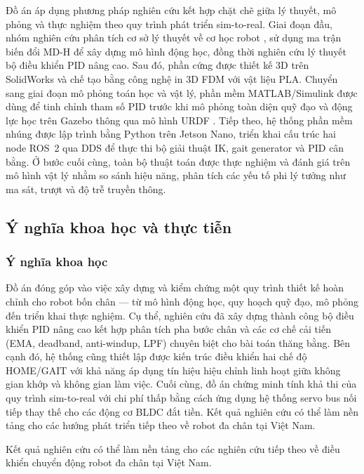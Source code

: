 Đồ án áp dụng phương pháp nghiên cứu kết hợp chặt chẽ giữa lý thuyết, mô phỏng và thực nghiệm theo quy trình phát triển sim-to-real. Giai đoạn đầu, nhóm nghiên cứu phân tích cơ sở lý thuyết về cơ học robot \cite{siciliano2009, craig2005, spong2020}, sử dụng ma trận biến đổi MD-H để xây dựng mô hình động học, đồng thời nghiên cứu lý thuyết bộ điều khiển PID nâng cao. Sau đó, phần cứng được thiết kế 3D trên SolidWorks và chế tạo bằng công nghệ in 3D FDM với vật liệu PLA. Chuyển sang giai đoạn mô phỏng toán học và vật lý, phần mềm MATLAB/Simulink được dùng để tinh chỉnh tham số PID trước khi mô phỏng toàn diện quỹ đạo và động lực học trên Gazebo thông qua mô hình URDF \cite{ros2docs, gazebo}. Tiếp theo, hệ thống phần mềm nhúng được lập trình bằng Python trên Jetson Nano, triển khai cấu trúc hai node ROS~2 qua DDS để thực thi bộ giải thuật IK, gait generator và PID cân bằng. Ở bước cuối cùng, toàn bộ thuật toán được thực nghiệm và đánh giá trên mô hình vật lý nhằm so sánh hiệu năng, phân tích các yếu tố phi lý tưởng như ma sát, trượt và độ trễ truyền thông.

\subsection{Ý nghĩa khoa học và thực tiễn}

\subsubsection*{Ý nghĩa khoa học}
Đồ án đóng góp vào việc xây dựng và kiểm chứng một quy trình thiết kế hoàn chỉnh cho robot bốn chân --- từ mô hình động học, quy hoạch quỹ đạo, mô phỏng đến triển khai thực nghiệm. Cụ thể, nghiên cứu đã xây dựng thành công bộ điều khiển PID nâng cao kết hợp phân tích pha bước chân và các cơ chế cải tiến (EMA, deadband, anti-windup, LPF) chuyên biệt cho bài toán thăng bằng. Bên cạnh đó, hệ thống cũng thiết lập được kiến trúc điều khiển hai chế độ HOME/GAIT với khả năng áp dụng tín hiệu hiệu chỉnh linh hoạt giữa không gian khớp và không gian làm việc. Cuối cùng, đồ án chứng minh tính khả thi của quy trình sim-to-real với chi phí thấp bằng cách ứng dụng hệ thống servo bus nối tiếp thay thế cho các động cơ BLDC đắt tiền. Kết quả nghiên cứu có thể làm nền tảng cho các hướng phát triển tiếp theo về robot đa chân tại Việt Nam.

Kết quả nghiên cứu có thể làm nền tảng cho các nghiên cứu tiếp theo về điều khiển chuyển động robot đa chân tại Việt Nam.

